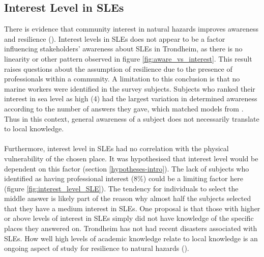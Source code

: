 \subsection{Interest Level in SLEs}
There is evidence that community interest in natural hazards improves awareness and resilience (\cite{cutter_community_2020}). Interest levels in SLEs does not appear to be a factor influencing stakeholders' awareness about SLEs in Trondheim, as there is no linearity or other pattern observed in figure \ref{fig:aware_vs_interest}. This result raises questions about the assumption of resilience due to the presence of professionals within a community. A limitation to this conclusion is that no marine workers were identified in the survey subjects. Subjects who ranked their interest in sea level as high (4) had the largest variation in determined awareness according to the number of answers they gave, which matched models from \cite{kartverket_se_2021}. Thus in this context, general awareness of a subject does not necessarily translate to local knowledge.
\paragraph{}
Furthermore, interest level in SLEs had no correlation with the physical vulnerability of the chosen place. It was hypothesised that interest level would be dependent on this factor (section \ref{hypotheses-intro}). The lack of subjects who identified as having professional interest (8\%) could be a limiting factor here (figure \ref{fig:interest_level_SLE}). The tendency for individuals to select the middle answer is likely part of the reason why almost half the subjects selected that they have a medium interest in SLEs. One proposal is that those with higher or above levels of interest in SLEs simply did not have knowledge of the specific places they answered on. Trondheim has not had recent disasters associated with SLEs. How well high levels of academic knowledge relate to local knowledge is an ongoing aspect of study for resilience to natural hazards (\cite{lujala_role_2020}).
\paragraph{}



   

